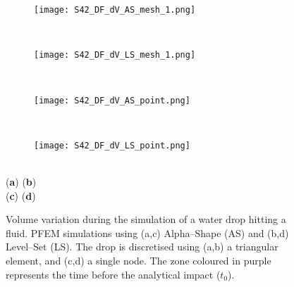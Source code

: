\documentclass[final,3p,times]{elsarticle}
\begin{document}
\begin{figure}[t!]
\captionsetup[subfigure]{labelformat=empty}
\centering 
	\begin{subfigure}[b]{0.48\textwidth}
		\texttt{[image: S42\_DF\_dV\_AS\_mesh\_1.png]}
		\caption{}
		\label{Fig:dropV_a}
	\end{subfigure}
	~
	\begin{subfigure}[b]{0.48\textwidth}	
		\texttt{[image: S42\_DF\_dV\_LS\_mesh\_1.png]}
		\caption{}
		\label{Fig:dropV_b}
	\end{subfigure}
	\vspace{-4mm}\\
	\begin{subfigure}[b]{0.48\textwidth}
		\texttt{[image: S42\_DF\_dV\_AS\_point.png]}
		\caption{}
		\label{Fig:dropV_e}
	\end{subfigure}
	~
	\begin{subfigure}[b]{0.48\textwidth}	
		\texttt{[image: S42\_DF\_dV\_LS\_point.png]}
		\caption{}
		\label{Fig:dropV_f}
	\end{subfigure}
	\\
	\vspace{-62mm}
	\hspace{-80mm} \footnotesize{(\textbf{a})} \hspace{75mm} (\textbf{b}) 
	\\
	\vspace{26mm}
	\hspace{-80mm} (\textbf{c}) \hspace{75mm} (\textbf{d}) 
	\\
	\vspace{23mm}
\caption{Volume variation during the simulation of a water drop hitting a fluid. PFEM simulations using (a,c) Alpha--Shape (AS) and (b,d) Level--Set (LS). The drop is discretised using (a,b) a triangular element, and (c,d) a single node. The zone coloured in purple represents the time before the analytical impact ($t_0$).}
\label{Fig:dropV}
\end{figure}
\end{document}
